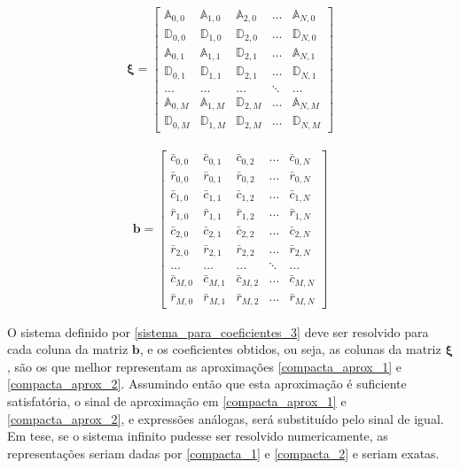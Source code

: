 \begin{align}
\mathbf{\xi}
=
\begin{bmatrix}
\mathbb{A}_{0,0} & \mathbb{A}_{1,0} & \mathbb{A}_{2,0} & \ldots & \mathbb{A}_{N,0} \\
\mathbb{D}_{0,0} & \mathbb{D}_{1,0} & \mathbb{D}_{2,0} & \ldots & \mathbb{D}_{N,0} \\
\mathbb{A}_{0,1} & \mathbb{A}_{1,1} & \mathbb{D}_{2,1} & \ldots & \mathbb{A}_{N,1} \\
\mathbb{D}_{0,1} & \mathbb{D}_{1,1} & \mathbb{D}_{2,1} & \ldots & \mathbb{D}_{N,1} \\
\ldots & \ldots & \ldots & \ddots & \ldots \\
\mathbb{A}_{0,M} & \mathbb{A}_{1,M} & \mathbb{D}_{2,M} & \ldots & \mathbb{A}_{N,M} \\
\mathbb{D}_{0,M} & \mathbb{D}_{1,M} & \mathbb{D}_{2,M} & \ldots & \mathbb{D}_{N,M}
\end{bmatrix}
\end{align}

\begin{align}
\mathbf{b}
=
\begin{bmatrix}
\bar{c}_{0, 0} & \bar{c}_{0, 1} &\bar{c}_{0, 2} & \ldots & \bar{c}_{0, N} \\
\bar{r}_{0, 0} & \bar{r}_{0, 1} &\bar{r}_{0, 2} & \ldots & \bar{r}_{0, N} \\
\bar{c}_{1, 0} & \bar{c}_{1, 1} &\bar{c}_{1, 2} & \ldots & \bar{c}_{1, N} \\
\bar{r}_{1, 0} & \bar{r}_{1, 1} &\bar{r}_{1, 2} & \ldots & \bar{r}_{1, N} \\
\bar{c}_{2, 0} & \bar{c}_{2, 1} &\bar{c}_{2, 2} & \ldots & \bar{c}_{2, N} \\
\bar{r}_{2, 0} & \bar{r}_{2, 1} &\bar{r}_{2, 2} & \ldots & \bar{r}_{2, N} \\
\ldots & \ldots & \ldots & \ddots & \ldots \\
\bar{c}_{M, 0} & \bar{c}_{M, 1} &\bar{c}_{M, 2} & \ldots & \bar{c}_{M, N} \\
\bar{r}_{M, 0} & \bar{r}_{M, 1} &\bar{r}_{M, 2} & \ldots & \bar{r}_{M, N}
\end{bmatrix}
\end{align}

 O sistema definido por \eqref{sistema_para_coeficientes_3} deve ser resolvido para cada coluna da matriz $\mathbf{b}$, e os coeficientes obtidos, ou seja, as colunas da matriz $\mathbf{\xi}$, são os que melhor representam as aproximações \eqref{compacta_aprox_1} e \eqref{compacta_aprox_2}. Assumindo então que esta aproximação é suficiente satisfatória, o sinal de aproximação em \eqref{compacta_aprox_1} e \eqref{compacta_aprox_2}, e expressões análogas, será substituído pelo sinal de igual. Em tese, se o sistema infinito pudesse ser resolvido numericamente, as representações seriam dadas por \eqref{compacta_1} e \eqref{compacta_2} e seriam exatas.

